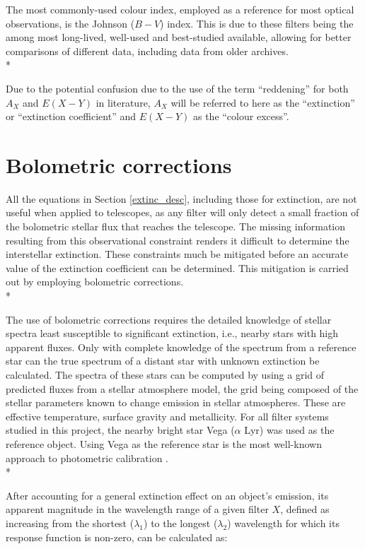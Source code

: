 \documentclass[12pt, a4paper]{report}
\begin{document}
The most commonly-used colour index, employed as a reference for most optical observations, is the Johnson ($B-V$) index. This is due to these filters being the among most long-lived, well-used and best-studied available, allowing for better comparisons of different data, including data from older archives. \\*

Due to the potential confusion due to the use of the term ``reddening'' for both $A_{X}$ and $E(X-Y)$ in literature, $A_{X}$ will be referred to here as the ``extinction'' or ``extinction coefficient'' and $E(X-Y)$ as the ``colour excess''.

\section{Bolometric corrections} \label{BC_theory}
All the equations in Section \ref{extinc_desc}, including those for extinction, are not useful when applied to telescopes, as any filter will only detect a small fraction of the bolometric stellar flux that reaches the telescope. The missing information resulting from this observational constraint renders it difficult to determine the interstellar extinction. These constraints much be mitigated before an accurate value of the extinction coefficient can be determined. This mitigation is carried out by employing bolometric corrections.\\*

The use of bolometric corrections requires the detailed knowledge of stellar spectra least susceptible to significant extinction, i.e., nearby stars with high apparent fluxes. Only with complete knowledge of the spectrum from a reference star can the true spectrum of a distant star with unknown extinction be calculated. The spectra of these stars can be computed by using a grid of predicted fluxes from a stellar atmosphere model, the grid being composed of the stellar parameters known to change emission in stellar atmospheres. These are effective temperature, surface gravity and metallicity. For all filter systems studied in this project, the nearby bright star Vega ($\alpha$ Lyr) was used as the reference object. Using Vega as the reference star is the most well-known approach to photometric calibration \citep{2014MNRAS.444..392C}.\\*

After accounting for a general extinction effect on an object's emission, its apparent magnitude in the wavelength range of a given filter $X$, defined as increasing from the shortest ($\lambda_{1}$) to the longest ($\lambda_{2}$) wavelength for which its response function is non-zero, can be calculated as:
\end{document}
